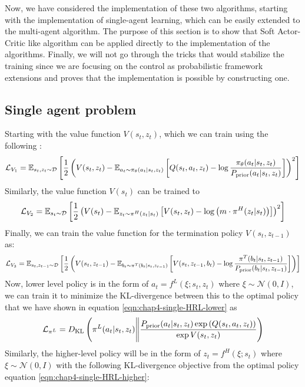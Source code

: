 Now, we have considered the implementation of these two algorithms, starting with the implementation of single-agent learning, which can be easily extended to the multi-agent algorithm. The purpose of this section is to show that Soft Actor-Critic like algorithm can be applied directly to the implementation of the algorithms. Finally, we will not go through the tricks that would stabilize the training since we are focusing on the control as probabilistic framework extensions and proves that the implementation is possible by constructing one.
 
\subsection{Single agent problem}
Starting with the value function $V(s_t, z_t)$, which we can train using the following :
\begin{equation}
    \mathcal{L}_{V_1} = \mathbb{E}_{s_t, z_t \sim \mathcal{D}} \left[ \frac{1}{2}\left( V(s_t, z_t) - \mathbb{E}_{a_t \sim \pi_\theta(a_t | s_t, z_t)}\left[ Q(s_t, a_t, z_t) - \log \frac{\pi_\theta(a_t | s_t, z_t)}{P_{\text{prior}}(a_t | s_t, z_t)} \right] \right)^2 \right]
\end{equation}
Similarly, the value function $V(s_t)$ can be trained to 
\begin{equation}
    \mathcal{L}_{V_2} = \mathbb{E}_{s_t \sim \mathcal{D}}\left[ \frac{1}{2}\left( V(s_t) - \mathbb{E}_{z_t \sim \pi^H(z_t | s_t)}\left[ V(s_t, z_t) - \log\left( m\cdot \pi^H(z_t | s_t) \right) \right] \right)^2 \right]
\end{equation}
Finally, we can train the value function for the termination policy $V(s_t, z_{t-1})$ as:
\begin{equation}
    \mathcal{L}_{V_3} = \mathbb{E}_{s_t, z_{t-1} \sim \mathcal{D}}\left[ \frac{1}{2}\left( V(s_t, z_{t-1}) - \mathbb{E}_{b_t \sim \pi^T(b_t | s_t, z_{t-1})}\left[  V(s_t, z_{t-1}, b_t) - \log \frac{\pi^T(b_t | s_t, z_{t-1})}{P_{\text{prior}}(b_t | s_t, z_{t-1})} \right]   \right) \right]
\end{equation}
Now, lower level policy is in the form of $a_t = f^L(\xi ; s_t, z_t)$ where $\xi \sim \mathcal{N}(0, I)$, we can train it to minimize the KL-divergence between this to the optimal policy that we have shown in equation \ref{eqn:chap4-single-HRL-lower} as
\begin{equation}
    \mathcal{L}_{\pi^L} = D_{\mathrm{KL}}\left( \pi^L(a_t | s_t, z_t) \Bigg\| \frac{P_{\text{prior}}(a_{t} | s_{t}, z_{t})\exp\left( Q(s_{t}, a_{t}, z_{t}) \right)}{\exp V(s_{t}, z_{t})} \right)
\end{equation}
Similarly, the higher-level policy will be in the form of $z_t = f^H(\xi ; s_t)$ where $\xi \sim \mathcal{N}(0, I)$ with the following KL-divergence objective from the optimal policy equation \ref{eqn:chap4-single-HRL-higher}:

